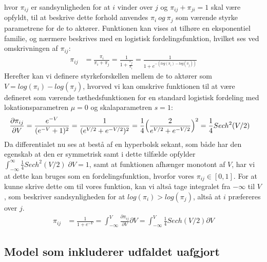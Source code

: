 \documentclass[11pt,a4paper]{article}
\begin{document}
hvor $\pi_{ij}$ er sandsynligheden for at $i$ vinder over $j$ og $\pi_{ij}+\pi_{ji} = 1$ skal være opfyldt, til at beskrive dette forhold anvendes $\pi_i \ og \ \pi_j$ som værende styrke parametrene for de to aktører.
Funktionen kan vises at tilhøre en eksponentiel familie, og nærmere beskrives med en logistisk fordelingsfunktion, hvilket ses ved omskrivningen af $\pi_{ij}$:\\
\begin{align*}
\pi_{ij} &= \frac{\pi_i}{\pi_i+\pi_j}=\frac{1}{1+\frac{\pi_j}{\pi_i}}=\frac{1}{1+e^{-(log(\pi_i)-log(\pi_j))}}   
\end{align*}
Herefter kan vi definere styrkeforskellen mellem de to aktører som $V = log(\pi_i)-log(\pi_j)$, hvorved vi kan omskrive funktionen til at være defineret som værende tæthedsfunktionen for en standard logistisk fordeling med lokationsparametren $\mu = 0$ og skalaparametren $s = 1$:
\begin{align*}
\frac{\partial \pi_{ij}}{\partial V} &= \frac{e^{-V}}{(e^{-V}+1)^2} = \frac{1}{(e^{V/2}+e^{-V/2})^2} = \frac{1}{4}\Big{(}\frac{2}{e^{V/2}+e^{-V/2}}\Big{)}^2 = \frac{1}{4}Sech^2(V/2)    
\end{align*}
Da differentialet nu ses at bestå af en hyperbolsk sekant, som både har den egenskab at den er symmetrisk samt i dette tilfælde opfylder $\int_{-\infty}^{\infty} \frac{1}{4}Sech^2(V/2) \; \partial V = 1$, samt at funktionen afhænger monotont af $V$, har vi at dette kan bruges som en fordelingsfunktion, hvorfor vores $\pi_{ij} \in [0,1]$. For at kunne skrive dette om til vores funktion, kan vi altså tage integralet fra $-\infty$ til $V$, som beskriver sandsynligheden for at $log(\pi_i) > log(\pi_j)$, altså at $i$ præfereres over $j$.
\begin{align*}
\pi_{ij} &= \frac{1}{1+e^{-V}} = \int_{-\infty}^{V} \frac{\partial \pi_{ij}}{\partial V} \partial V = \int_{-\infty}^{V} \frac{1}{4}Sech(V/2) \partial V    
\end{align*}
\subsection{Model som inkluderer udfaldet uafgjort}
\end{document}

